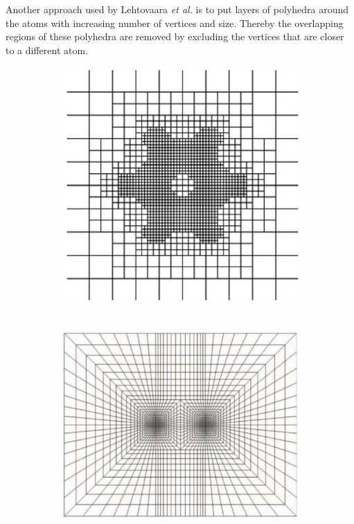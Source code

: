 Another approach used by Lehtovaara \textit{et al.} \cite{fe_dft2} is to put layers of polyhedra around the atoms with increasing number of vertices and size.
Thereby the overlapping regions of these polyhedra are removed by excluding the vertices that are closer to a different atom.
\begin{figure}
  \begin{subfigure}{0.23\textwidth}
   \includegraphics[width=\textwidth]{Figures/QuadMeshBenzene}
   \vspace{-43mm}\caption{$\qquad\qquad\qquad\qquad$}
   \label{fig:HexBenz}
  \end{subfigure}
  \begin{subfigure}{0.28\textwidth}
   \includegraphics[width=\textwidth]{Figures/QuadDiatomic}

\end{subfigure}
\end{figure}
